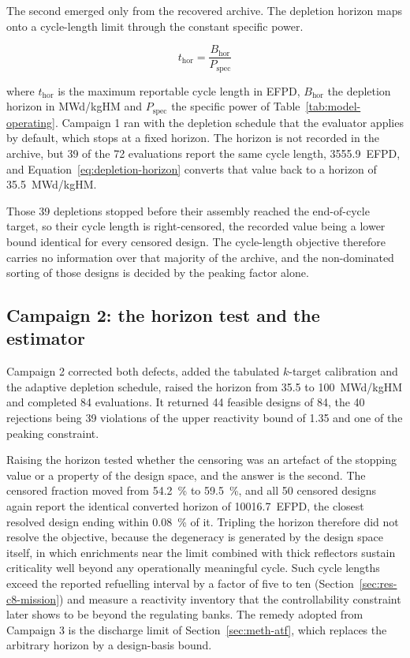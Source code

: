 The second emerged only from the recovered archive. The depletion
horizon maps onto a cycle-length limit through the constant specific
power.

\begin{equation}
  t_\mathrm{hor} = \frac{B_\mathrm{hor}}{P_\mathrm{spec}}
  \label{eq:depletion-horizon}
\end{equation}

\noindent where $t_\mathrm{hor}$ is the maximum reportable cycle length
in EFPD, $B_\mathrm{hor}$ the depletion horizon in MWd/kgHM and
$P_\mathrm{spec}$ the specific power of
Table~\ref{tab:model-operating}. Campaign 1 ran with the depletion
schedule that the evaluator applies by default, which stops at a fixed
horizon. The horizon is not recorded in the archive, but 39 of the 72
evaluations report the same cycle length, \SI{3555.9}{EFPD}, and
Equation~\eqref{eq:depletion-horizon} converts that value back to a
horizon of \SI{35.5}{MWd/kgHM}.

Those 39 depletions stopped before their assembly reached the
end-of-cycle target, so their cycle length is right-censored, the
recorded value being a lower bound identical for every censored design. The cycle-length
objective therefore carries no information over that majority of the
archive, and the non-dominated sorting of those designs is decided by
the peaking factor alone.

\subsection{Campaign 2: the horizon test and the estimator}
\label{sec:res-c2}

Campaign 2 corrected both defects, added the tabulated $k$-target
calibration and the adaptive depletion schedule, raised the horizon
from 35.5 to \SI{100}{MWd/kgHM} and completed 84 evaluations. It
returned 44 feasible designs of 84, the 40 rejections being 39
violations of the upper reactivity bound of 1.35 and one of the peaking
constraint.

Raising the horizon tested whether the censoring was an artefact of the
stopping value or a property of the design space, and the answer is the
second. The censored fraction moved from \SI{54.2}{\%} to
\SI{59.5}{\%}, and all 50 censored
designs again report the identical converted horizon of
\SI{10016.7}{EFPD}, the closest resolved design ending within
\SI{0.08}{\%} of it. Tripling the horizon therefore did not resolve the
objective, because the degeneracy is generated by the design space
itself, in which enrichments near the limit combined with thick
reflectors sustain criticality well beyond any operationally meaningful
cycle. Such cycle lengths exceed the reported refuelling interval by a
factor of five to ten (Section~\ref{sec:res-c8-mission}) and measure a
reactivity inventory that the controllability constraint later shows to be
beyond the regulating banks. The remedy adopted from Campaign 3 is the
discharge limit of Section~\ref{sec:meth-atf}, which replaces the
arbitrary horizon by a design-basis bound.


